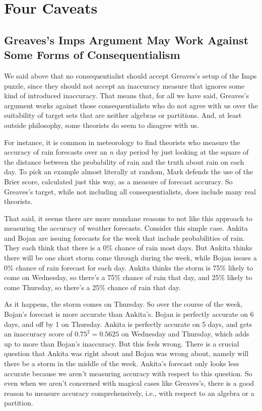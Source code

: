 \section{Four Caveats}
\label{fourcaveats}

\subsection{Greaves's Imps Argument May Work Against Some Forms of Consequentialism}
\label{greavessargumentmayworkagainstsomeformsofconsequentialism}

We said above that no consequentialist should accept Greaves's setup of the Imps puzzle, since they should not accept an inaccuracy measure that ignores some kind of introduced inaccuracy. That means that, for all we have said, Greaves's argument works against those consequentialists who do not agree with us over the suitability of target sets that are neither algebras or partitions. And, at least outside philosophy, some theorists do seem to disagree with us.

For instance, it is common in meteorology to find theorists who measure the accuracy of rain forecasts over an $n$ day period by just looking at the square of the distance between the probability of rain and the truth about rain on each day. To pick an example almost literally at random, Mark  \citet{Roulston2007} defends the use of the Brier score, calculated just this way, as a measure of forecast accuracy. So Greaves's target, while not including all consequentialists, does include many real theorists.

That said, it seems there are more mundane reasons to not like this approach to measuring the accuracy of weather forecasts. Consider this simple case. Ankita and Bojan are issuing forecasts for the week that include probabilities of rain. They each think that there is a 0\% chance of rain most days. But Ankita thinks there will be one short storm come through during the week, while Bojan issues a 0\% chance of rain forecast for each day. Ankita thinks the storm is 75\% likely to come on Wednesday, so there's a 75\% chance of rain that day, and 25\% likely to come Thursday, so there's a 25\% chance of rain that day.

As it happens, the storm comes on Thursday. So over the course of the week, Bojan's forecast is more accurate than Ankita's. Bojan is perfectly accurate on 6 days, and off by 1 on Thursday. Ankita is perfectly accurate on 5 days, and gets an inaccuracy score of $0.75^2 = 0.5625$ on Wednesday and Thursday, which adds up to more than Bojan's inaccuracy. But this feels wrong. There is a crucial question that Ankita was right about and Bojan was wrong about, namely will there be a storm in the middle of the week. Ankita's forecast only looks less accurate because we aren't measuring accuracy with respect to this question. So even when we aren't concerned with magical cases like Greaves's, there is a good reason to measure accuracy comprehensively, i.e., with respect to an algebra or a partition.

